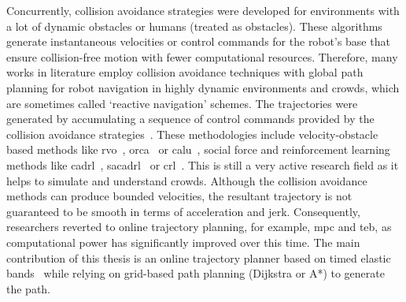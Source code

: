 Concurrently, collision avoidance strategies were developed for environments with a lot of dynamic obstacles or humans (treated as obstacles). These algorithms generate instantaneous velocities or control commands for the robot's base that ensure collision-free motion with fewer computational resources. Therefore, many works in literature employ collision avoidance techniques with global path planning for robot navigation in highly dynamic environments and crowds, which are sometimes called `reactive navigation' schemes. The trajectories were generated by accumulating a sequence of control commands provided by the collision avoidance strategies~\cite{prassler1999navigating}. These methodologies include velocity-obstacle based methods like \acrshort{rvo}~\cite{van2008reciprocal}, \acrshort{orca}~\cite{berg2011reciprocal} or \acrshort{calu}~\cite{hennes2012multi}, social force and reinforcement learning methods like \acrshort{cadrl}~\cite{chen2017decentralized}, \acrshort{sacadrl}~\cite{chen2017socially} or \acrshort{crl}~\cite{ciou2018composite}. This is still a very active research field as it helps to simulate and understand crowds. Although the collision avoidance methods can produce bounded velocities, the resultant trajectory is not guaranteed to be smooth in terms of acceleration and jerk. Consequently, researchers reverted to online trajectory planning, for example, \acrshort{mpc} and \acrfull{teb}, as computational power has significantly improved over this time. The main contribution of this thesis is an online trajectory planner based on timed elastic bands~\cite{rosmann2013efficient} while relying on grid-based path planning (Dijkstra or A*) to generate the path.





